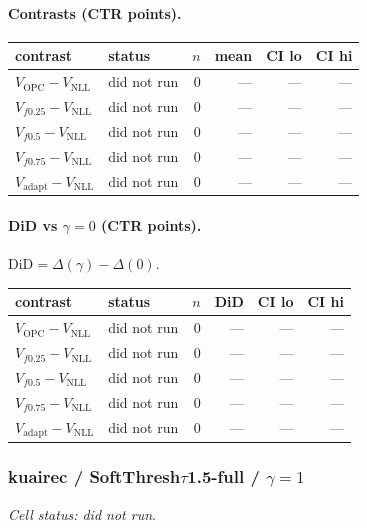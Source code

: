 \documentclass[10pt,a4paper]{article}
\begin{document}
\paragraph{Contrasts (CTR points).}
{\centering\small\begin{tabular}{llrrrr}
\toprule contrast & status & $n$ & mean & CI lo & CI hi \\
\midrule
$V_{\mathrm{OPC}}-V_{\mathrm{NLL}}$ & did not run & 0 & --- & --- & --- \\
$V_{f0.25}-V_{\mathrm{NLL}}$ & did not run & 0 & --- & --- & --- \\
$V_{f0.5}-V_{\mathrm{NLL}}$ & did not run & 0 & --- & --- & --- \\
$V_{f0.75}-V_{\mathrm{NLL}}$ & did not run & 0 & --- & --- & --- \\
$V_{\mathrm{adapt}}-V_{\mathrm{NLL}}$ & did not run & 0 & --- & --- & --- \\
\bottomrule\end{tabular}\par}
\paragraph{DiD vs $\gamma=0$ (CTR points).} $\mathrm{DiD}=\Delta(\gamma)-\Delta(0)$.
{\centering\small\begin{tabular}{llrrrr}
\toprule contrast & status & $n$ & DiD & CI lo & CI hi \\
\midrule
$V_{\mathrm{OPC}}-V_{\mathrm{NLL}}$ & did not run & 0 & --- & --- & --- \\
$V_{f0.25}-V_{\mathrm{NLL}}$ & did not run & 0 & --- & --- & --- \\
$V_{f0.5}-V_{\mathrm{NLL}}$ & did not run & 0 & --- & --- & --- \\
$V_{f0.75}-V_{\mathrm{NLL}}$ & did not run & 0 & --- & --- & --- \\
$V_{\mathrm{adapt}}-V_{\mathrm{NLL}}$ & did not run & 0 & --- & --- & --- \\
\bottomrule\end{tabular}\par}
\bigskip
\subsubsection{kuairec / SoftThresh$\tau$1.5-full / $\gamma=1$}
\emph{Cell status: did not run}.
\end{document}

